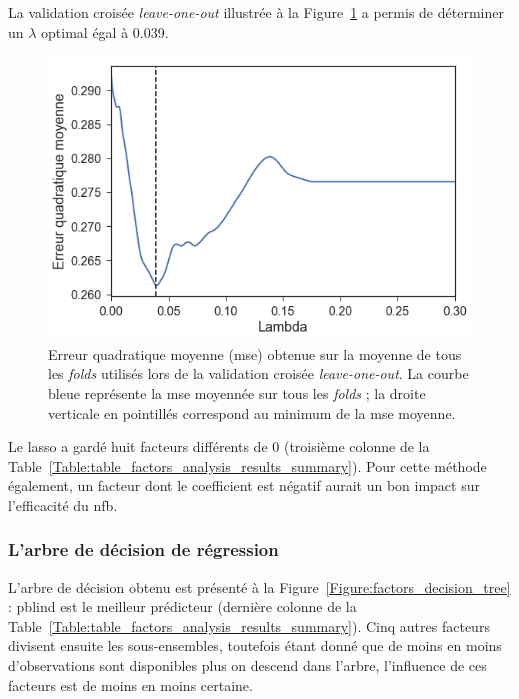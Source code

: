 La validation croisée \textit{leave-one-out} illustrée à la Figure~\ref{Figure:selection_lambda_lasso} a permis de déterminer un $\lambda$ optimal égal à 0.039.
\begin{figure}[h!]
  \centering
	\includegraphics[width=0.7\linewidth]{figures/chapter-3/factors-selection-lasso-best-lambda} 
  \caption[Erreur quadratique moyenne obtenue sur la moyenne de tous les \textit{folds} utilisés lors de la validation 
	croisée \textit{leave-one-out}.]{Erreur quadratique moyenne (\gls{mse}) obtenue sur la moyenne de tous les \textit{folds} utilisés lors de la validation 
	croisée \textit{leave-one-out}. La courbe bleue représente la \gls{mse} moyennée sur tous les \textit{folds} ; la droite verticale en pointillés correspond
	au minimum de la \gls{mse} moyenne.}
  \label{Figure:selection_lambda_lasso}
\end{figure}

Le \gls{lasso} a gardé huit facteurs différents de 0 (troisième colonne de la Table~\ref{Table:table_factors_analysis_results_summary}). Pour cette méthode également,
un facteur dont le coefficient est négatif aurait un bon impact sur l'efficacité du \gls{nfb}.

\subsubsection{L'arbre de décision de régression}

L'arbre de décision obtenu est présenté à la Figure~\ref{Figure:factors_decision_tree} : \gls{pblind} est le meilleur prédicteur (dernière colonne de la
Table~\ref{Table:table_factors_analysis_results_summary}). Cinq autres facteurs divisent ensuite les sous-ensembles, toutefois étant donné que de moins
en moins d'observations sont disponibles plus on descend dans l'arbre, l'influence de ces facteurs est de moins en moins certaine.

